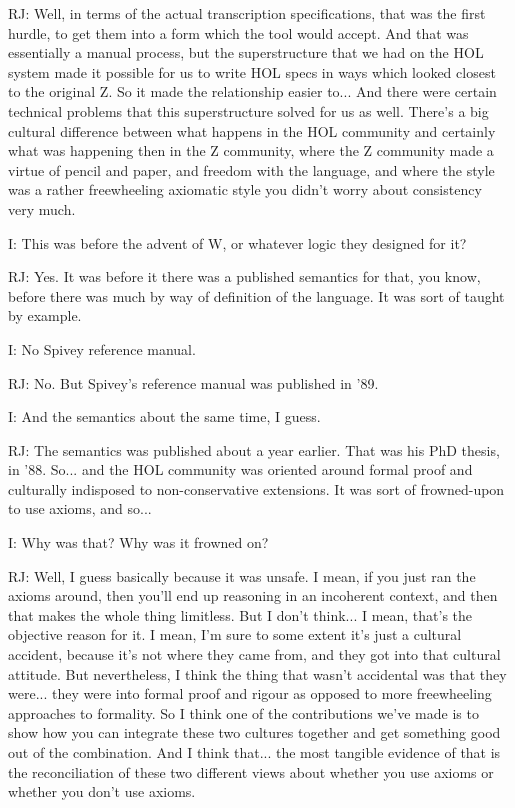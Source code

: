 \documentclass[10pt,titlepage]{book}
\begin{document}
RJ: Well, in terms of the actual transcription specifications, that was the first hurdle, to get them into a form which the tool would accept. And that was essentially a manual process, but the superstructure that we had on the HOL system made it possible for us to write HOL specs in ways which looked closest to the original Z. So it made the relationship easier to... And there were certain technical problems that this superstructure solved for us as well. There's a big cultural difference between what happens in the HOL community and certainly what was happening then in the Z community, where the Z community made a virtue of pencil and paper, and freedom with the language, and where the style was a rather freewheeling axiomatic style you didn't worry about consistency very much.

I: This was before the advent of W, or whatever logic they designed for it?

RJ: Yes. It was before it there was a published semantics for that, you know, before there was much by way of definition of the language. It was sort of taught by example.

I: No Spivey reference manual.

RJ: No. But Spivey's reference manual was published in '89.

I: And the semantics about the same time, I guess.

RJ: The semantics was published about a year earlier. That was his PhD thesis, in '88. So... and the HOL community was oriented around formal proof and culturally indisposed to non-conservative extensions. It was sort of frowned-upon to use axioms, and so...

I: Why was that? Why was it frowned on?

RJ: Well, I guess basically because it was unsafe. I mean, if you just ran the axioms around, then you'll end up reasoning in an incoherent context, and then that makes the whole thing limitless. But I don't think... I mean, that's the objective reason for it. I mean, I'm sure to some extent it's just a cultural accident, because it's not where they came from, and they got into that cultural attitude. But nevertheless, I think the thing that wasn't accidental was that they were... they were into formal proof and rigour as opposed to more freewheeling approaches to formality. So I think one of the contributions we've made is to show how you can integrate these two cultures together and get something good out of the combination. And I think that... the most tangible evidence of that is the reconciliation of these two different views about whether you use axioms or whether you don't use axioms.
\end{document}
